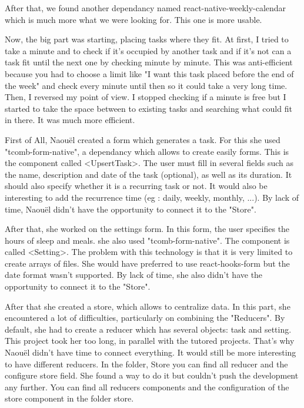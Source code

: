 \documentclass[a4paper,12pt]{article}
\begin{document}
\bigskip
After that, we found another dependancy named react-native-weekly-calendar which is much more what we were looking for. This one is more usable. 

\bigskip
Now, the big part was starting, placing tasks where they fit. At first, I tried to take a minute and to check if it's occupied by another task and if it's not can a task fit until the next one by checking minute by minute. This was anti-efficient because you had to choose a limit like "I want this task placed before the end of the week" and check every minute until then so it could take a very long time. Then, I reversed my point of view. I stopped checking if a minute is free but I started to take the space between to existing tasks and searching what could fit in there. It was much more efficient.

\bigskip
First of All, Naouël created a form which generates a task. For this she used "tcomb-form-native", a dependancy which allows to create easily forms. This is the component called <UpsertTask>. The user must fill in several fields such as the name, description and date of the task (optional), as well as its duration. It should also specify whether it is a recurring task or not. It would also be interesting to add the recurrence time (eg : daily, weekly, monthly, ...). By lack of time, Naouël didn't have the opportunity to connect it to the "Store".
    
\bigskip
After that, she worked on the settings form. In this form, the user specifies the hours of sleep and meals. she also used "tcomb-form-native". The component is called <Setting>. The problem with this technology is that it is very limited to create arrays of files. She would have preferred to use react-hooks-form but the date format wasn't supported. By lack of time, she also didn't have the opportunity to connect it to the "Store".  
 
\bigskip
After that she created a store, which allows to centralize data. In this part, she encountered a lot of difficulties, particularly on combining the "Reducers". By default, she had to create a reducer which has several objects: task and setting. This project took her too long, in parallel with the tutored projects. That's why Naouël didn't have time to connect everything. It would still be more interesting to have different reducers. In the folder, Store you can find all reducer and the configure store field. She found a way to do it but couldn't push the development any further.
You can find all reducers components and the configuration of the store component in the folder store.
\end{document}

